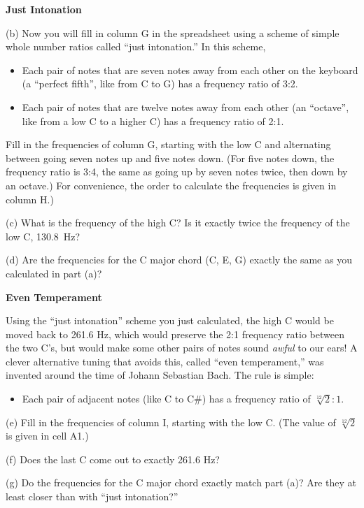 \medskip
\textbf{Just Intonation}

(b) Now you will fill in column G in the spreadsheet using a scheme of simple whole number ratios called ``just intonation.'' In this scheme, 
\begin{itemize}[nosep]
\item Each pair of notes that are seven notes away from each other on the keyboard (a ``perfect fifth'', like from C to G) has a frequency ratio of 3:2.
\item Each pair of notes that are twelve notes away from each other (an ``octave'', like from a low C to a higher C) has a frequency ratio of 2:1.  
\end{itemize}
Fill in the frequencies of column G, starting with the low C and alternating between going seven notes up and five notes down.  (For five notes down, the frequency ratio is 3:4, the same as going up by seven notes twice, then down by an octave.) For convenience, the order to calculate the frequencies is given in column H.)

(c) What is the frequency of the high C? Is it exactly twice the frequency of the low C, 130.8~Hz?
\answerspace{0.3in}

(d) Are the frequencies for the C major chord (C, E, G) exactly the same as you calculated in part (a)?
\answerspace{0.3in}

\textbf{Even Temperament}

Using the ``just intonation'' scheme you just calculated, the high C would be moved back to 261.6 Hz, which would preserve the 2:1 frequency ratio between the two C's, but would make some other pairs of notes sound \textit{awful} to our ears!  A clever alternative tuning that avoids this, called ``even temperament,'' was invented around the time of Johann Sebastian Bach.  The rule is simple:
\begin{itemize}[nosep]
\item Each pair of adjacent notes (like C to C\#) has a frequency ratio of $\sqrt[12]{2}:1$.
\end{itemize}

(e) Fill in the frequencies of column I, starting with the low C.  (The value of $\sqrt[12]{2}$ is given in cell A1.)

(f) Does the last C come out to exactly 261.6 Hz?
\answerspace{0.3in}

(g) Do the frequencies for the C major chord exactly match part (a)?  Are they at least closer than with ``just intonation?''
\answerspace{0.3in}
